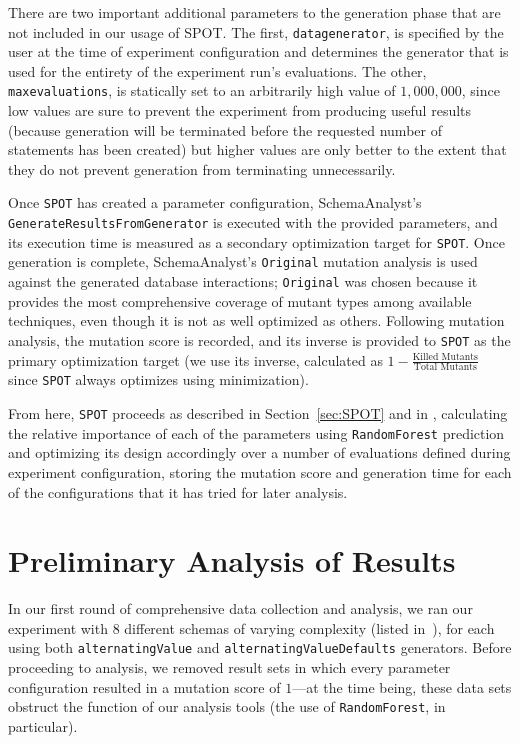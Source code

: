 \documentclass[a4paper,twocolumn]{article}
\begin{document}
There are two important additional parameters to the generation phase that are not included in our usage of SPOT. The first, \texttt{datagenerator}, is specified by the user at the time of experiment configuration and determines the generator that is used for the entirety of the experiment run's evaluations. The other, \texttt{maxevaluations}, is statically set to an arbitrarily high value of $1,000,000$, since low values are sure to prevent the experiment from producing useful results (because generation will be terminated before the requested number of statements has been created) but higher values are only better to the extent that they do not prevent generation from terminating unnecessarily.

Once \texttt{SPOT} has created a parameter configuration, SchemaAnalyst's \texttt{GenerateResultsFromGenerator} is executed with the provided parameters, and its execution time is measured as a secondary optimization target for \texttt{SPOT}. Once generation is complete, SchemaAnalyst's \texttt{Original} mutation analysis is used against the generated database interactions; \texttt{Original} was chosen because it provides the most comprehensive coverage of mutant types among available techniques, even though it is not as well optimized as others. Following mutation analysis, the mutation score is recorded, and its inverse is provided to \texttt{SPOT} as the primary optimization target (we use its inverse, calculated as $1 - \frac{\text{Killed Mutants}}{\text{Total Mutants}}$ since \texttt{SPOT} always optimizes using minimization).

From here, \texttt{SPOT} proceeds as described in Section~\ref{sec:SPOT} and in \cite{SPOT2005}, calculating the relative importance of each of the parameters using \texttt{RandomForest} prediction and optimizing its design accordingly over a number of evaluations defined during experiment configuration, storing the mutation score and generation time for each of the configurations that it has tried for later analysis.

\section{Preliminary Analysis of Results}

In our first round of comprehensive data collection and analysis, we ran our experiment with $8$ different schemas of varying complexity (listed in~), for each using both \texttt{alternatingValue} and \texttt{alternatingValueDefaults} generators. Before proceeding to analysis, we removed result sets in which every parameter configuration resulted in a mutation score of $1$---at the time being, these data sets obstruct the function of our analysis tools (the use of \texttt{RandomForest}, in particular).
\end{document}

